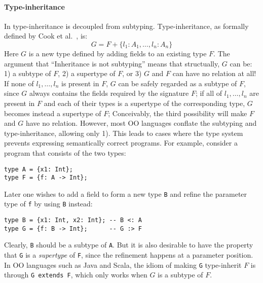 
\paragraph{Type-inheritance} In \name type-inheritance is decoupled
from subtyping. Type-inheritance, as formally defined by Cook et
al.~\cite{cook1989inheritance}, is:
\[
G = F + \{ l_1:A_1, \ldots, l_n:A_n \}
\]
Here $G$ is a new type defined by adding fields to an existing type $F$.
The argument that ``Inheritance is not subtyping'' means that structually, $G$ can
be: 1) a subtype of $F$, 2) a supertype of $F$, or 3) $G$ and $F$ can have no
relation at all! If none of $l_1, \ldots, l_n$ is present in $F$, $G$ can be
safely regarded as a subtype of $F$, since $G$ always contains the fields
required by the signature $F$; if all of $l_1, \ldots, l_n$ are present in $F$
and each of their types is a supertype of the corresponding type, $G$ becomes
instead a supertype of $F$; Conceivably, the third possibility will make $F$ and
$G$ have no relation. However, most OO languages conflate the
subtyping and type-inheritance, allowing only 1). This leads
to cases where the type system prevents expressing semantically
correct programs. For example, consider a program that consists of the two
types:
\begin{lstlisting}
type A = {x1: Int};
type F = {f: A -> Int};
\end{lstlisting}
Later one wishes to add a field to form a new type \lstinline$B$ and refine the
parameter type of \lstinline$f$ by using \lstinline$B$ instead:
\begin{lstlisting}
type B = {x1: Int, x2: Int}; -- B <: A
type G = {f: B -> Int};      -- G :> F
\end{lstlisting}
Clearly, \lstinline$B$ should be a subtype of \lstinline$A$. But it is also
desirable to have the property that \lstinline$G$ is a \emph{supertype} of
\lstinline$F$, since the refinement happens at a parameter position. In OO
languages such as Java and Scala, the idiom of making \lstinline$G$ type-inherit
$F$ is through \lstinline$G extends F$, which only works when $G$ is a
subtype of $F$.

